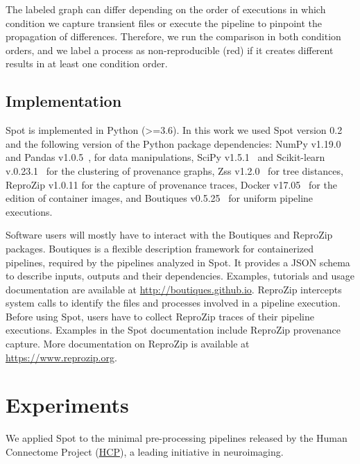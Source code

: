 \documentclass[a4paper,num-refs]{oup-contemporary}
\newcommand{\revised}[1]{\color{blue}#1\color{black}\xspace}
\newcommand{\reprozip}[0]{ReproZip\xspace}
\newcommand{\toolname}[0]{Spot\xspace}
\begin{document}
\revised{
The labeled graph can differ depending on the order of executions in which condition we capture transient files 
or execute the pipeline to pinpoint the propagation of differences. Therefore, we run the comparison in both condition orders, 
and we label a process as non-reproducible (red) if it creates different results in at least one condition order.}

\subsection{Implementation}
\revised{
\toolname is implemented in Python (>=3.6). In this work we used \toolname version 0.2 and the following version of
the Python package dependencies: NumPy v1.19.0~\cite{oliphant2006guide} and Pandas v1.0.5~\cite{mckinney2011pandas},
for data manipulations, SciPy v1.5.1~\cite{2020SciPy-NMeth} and Scikit-learn v.0.23.1~\cite{pedregosa2011scikit}
for the clustering of provenance graphs, Zss v1.2.0~\cite{zhang1989simple} for tree distances,
\reprozip v1.0.11 for the capture of provenance traces, Docker v17.05~\cite{merkel2014docker} for
the edition of container images, and Boutiques v0.5.25~\cite{glatard2018boutiques} for uniform pipeline executions.

Software users will mostly have to interact with the Boutiques and \reprozip packages.
Boutiques is a flexible description framework for containerized pipelines, required by
the pipelines analyzed in \toolname. It provides a JSON schema to describe inputs, outputs and their dependencies.
Examples, tutorials and usage documentation are available at \url{http://boutiques.github.io}. \reprozip intercepts
system calls to identify the files and processes involved in a pipeline execution.
Before using \toolname, users have to collect \reprozip traces of their pipeline executions.
Examples in the \toolname documentation include \reprozip provenance capture.
More documentation on \reprozip is available at \url{https://www.reprozip.org}.}

\section{Experiments}

We applied \toolname to the minimal
pre-processing pipelines released by the Human Connectome Project
(\href{https://www.humanconnectome.org}{HCP}), a leading initiative in
neuroimaging.

\end{document}
